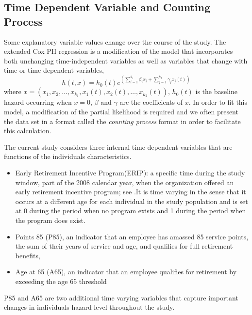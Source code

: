 \documentclass[12pt,letterpaper]{article}
\begin{document}
\subsection{Time Dependent Variable and Counting Process}
\label{sec:coxt}
Some explanatory variable values change over the course of the study. The extended Cox PH regression is a modification of the model that incorporates both unchanging time-independent variables as well as variables that change with time or time-dependent variables,
\begin{equation}
	\label{eq:timecovar}
	h(t,x)=h_0(t)e^{(\sum_{i=1}^{k_1}\beta_ix_i+\sum_{j=1}^{k_2}\gamma_jx_j(t))}
\end{equation}
where $x=(x_1, x_2, \ldots, x_{k_1}, x_1(t), x_2(t), \ldots, x_{k_2}(t))$, $h_0(t)$ is the baseline hazard occurring when $x=0$, $\beta$ and $\gamma$ are the coefficients of $x$. In order to fit this model, a modification of the partial likelihood is required and we often present the data set in a format called the {\it counting process} format in order to facilitate this calculation.

The current study considers three internal time dependent variables that are functions of the individuals characteristics.

\begin{itemize}
\item Early Retirement Incentive Program(ERIP): a specific time during the study window, part of the 2008 calendar year, when the organization offered an early retirement incentive program; see \citep{ERIP}.It is time varying in the sense that it occurs at a different age for each individual in the study population and is set at 0 during the period when no program exists and 1 during the period when the program does exist.
\item Points 85 (P85), an indicator that an employee has amassed 85 service points, the sum of their years of service and age, and qualifies for full retirement benefits,
\item Age at 65 (A65), an indicator that an employee qualifies for retirement by exceeding the age 65 threshold
\end{itemize}
P85 and A65 are two additional time varying variables that capture important changes in individuals hazard level throughout the study.

\end{document}
